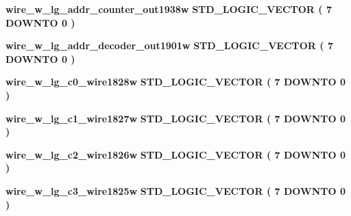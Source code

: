 \begin{DoxyCompactItemize}
\item 
{\bf wire\+\_\+w\+\_\+lg\+\_\+addr\+\_\+counter\+\_\+out1938w} {\bfseries \textcolor{comment}{S\+T\+D\+\_\+\+L\+O\+G\+I\+C\+\_\+\+V\+E\+C\+T\+OR}\textcolor{vhdlchar}{ }\textcolor{vhdlchar}{(}\textcolor{vhdlchar}{ }\textcolor{vhdlchar}{ } \textcolor{vhdldigit}{7} \textcolor{vhdlchar}{ }\textcolor{keywordflow}{D\+O\+W\+N\+TO}\textcolor{vhdlchar}{ }\textcolor{vhdlchar}{ } \textcolor{vhdldigit}{0} \textcolor{vhdlchar}{ }\textcolor{vhdlchar}{)}\textcolor{vhdlchar}{ }} 
\item 
{\bf wire\+\_\+w\+\_\+lg\+\_\+addr\+\_\+decoder\+\_\+out1901w} {\bfseries \textcolor{comment}{S\+T\+D\+\_\+\+L\+O\+G\+I\+C\+\_\+\+V\+E\+C\+T\+OR}\textcolor{vhdlchar}{ }\textcolor{vhdlchar}{(}\textcolor{vhdlchar}{ }\textcolor{vhdlchar}{ } \textcolor{vhdldigit}{7} \textcolor{vhdlchar}{ }\textcolor{keywordflow}{D\+O\+W\+N\+TO}\textcolor{vhdlchar}{ }\textcolor{vhdlchar}{ } \textcolor{vhdldigit}{0} \textcolor{vhdlchar}{ }\textcolor{vhdlchar}{)}\textcolor{vhdlchar}{ }} 
\item 
{\bf wire\+\_\+w\+\_\+lg\+\_\+c0\+\_\+wire1828w} {\bfseries \textcolor{comment}{S\+T\+D\+\_\+\+L\+O\+G\+I\+C\+\_\+\+V\+E\+C\+T\+OR}\textcolor{vhdlchar}{ }\textcolor{vhdlchar}{(}\textcolor{vhdlchar}{ }\textcolor{vhdlchar}{ } \textcolor{vhdldigit}{7} \textcolor{vhdlchar}{ }\textcolor{keywordflow}{D\+O\+W\+N\+TO}\textcolor{vhdlchar}{ }\textcolor{vhdlchar}{ } \textcolor{vhdldigit}{0} \textcolor{vhdlchar}{ }\textcolor{vhdlchar}{)}\textcolor{vhdlchar}{ }} 
\item 
{\bf wire\+\_\+w\+\_\+lg\+\_\+c1\+\_\+wire1827w} {\bfseries \textcolor{comment}{S\+T\+D\+\_\+\+L\+O\+G\+I\+C\+\_\+\+V\+E\+C\+T\+OR}\textcolor{vhdlchar}{ }\textcolor{vhdlchar}{(}\textcolor{vhdlchar}{ }\textcolor{vhdlchar}{ } \textcolor{vhdldigit}{7} \textcolor{vhdlchar}{ }\textcolor{keywordflow}{D\+O\+W\+N\+TO}\textcolor{vhdlchar}{ }\textcolor{vhdlchar}{ } \textcolor{vhdldigit}{0} \textcolor{vhdlchar}{ }\textcolor{vhdlchar}{)}\textcolor{vhdlchar}{ }} 
\item 
{\bf wire\+\_\+w\+\_\+lg\+\_\+c2\+\_\+wire1826w} {\bfseries \textcolor{comment}{S\+T\+D\+\_\+\+L\+O\+G\+I\+C\+\_\+\+V\+E\+C\+T\+OR}\textcolor{vhdlchar}{ }\textcolor{vhdlchar}{(}\textcolor{vhdlchar}{ }\textcolor{vhdlchar}{ } \textcolor{vhdldigit}{7} \textcolor{vhdlchar}{ }\textcolor{keywordflow}{D\+O\+W\+N\+TO}\textcolor{vhdlchar}{ }\textcolor{vhdlchar}{ } \textcolor{vhdldigit}{0} \textcolor{vhdlchar}{ }\textcolor{vhdlchar}{)}\textcolor{vhdlchar}{ }} 
\item 
{\bf wire\+\_\+w\+\_\+lg\+\_\+c3\+\_\+wire1825w} {\bfseries \textcolor{comment}{S\+T\+D\+\_\+\+L\+O\+G\+I\+C\+\_\+\+V\+E\+C\+T\+OR}\textcolor{vhdlchar}{ }\textcolor{vhdlchar}{(}\textcolor{vhdlchar}{ }\textcolor{vhdlchar}{ } \textcolor{vhdldigit}{7} \textcolor{vhdlchar}{ }\textcolor{keywordflow}{D\+O\+W\+N\+TO}\textcolor{vhdlchar}{ }\textcolor{vhdlchar}{ } \textcolor{vhdldigit}{0} \textcolor{vhdlchar}{ }\textcolor{vhdlchar}{)}\textcolor{vhdlchar}{ }} 

\end{DoxyCompactItemize}
